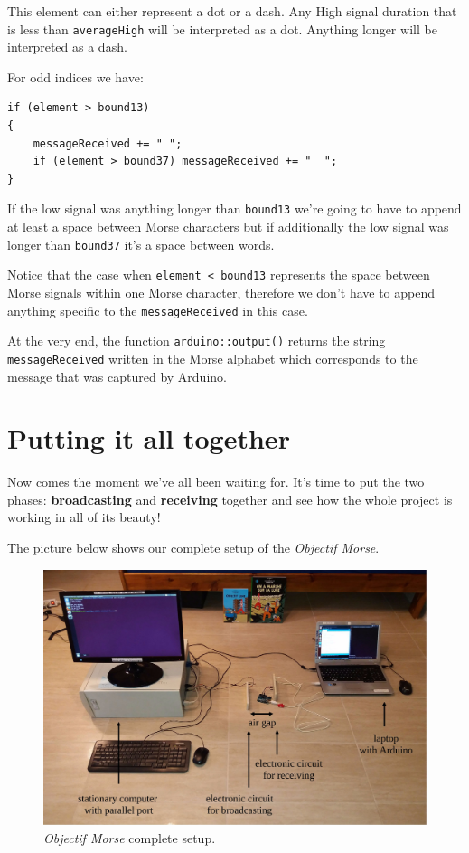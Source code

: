 \documentclass[12pt]{report}
\begin{document}
This element can either represent a dot or a dash. Any High signal duration that is less than \texttt{averageHigh} will be interpreted as a dot. Anything longer will be interpreted as a dash.

For odd indices we have:

\begin{lstlisting}
if (element > bound13)
{
	messageReceived += " ";
	if (element > bound37) messageReceived += "  ";
}
\end{lstlisting}

If the low signal was anything longer than \texttt{bound13} we're going to have to append at least a space between Morse characters but if additionally the low signal was longer than \texttt{bound37} it's a space between words.

Notice that the case when \texttt{element < bound13} represents the space between Morse signals within one Morse character, therefore we don't have to append anything specific to the \texttt{messageReceived} in this case.

At the very end, the function \texttt{arduino::output()} returns the string \texttt{messageReceived} written in the Morse alphabet which corresponds to the message that was captured by Arduino.

\chapter{Putting it all together}

Now comes the moment we've all been waiting for. It's time to put the two phases: \textbf{broadcasting} and \textbf{receiving} together and see how the whole project is working in all of its beauty!

The picture below shows our complete setup of the \textit{Objectif Morse}.

\begin{figure}[H]
\centering\includegraphics[width=14.5cm]{full_setup}
\caption{\textit{Objectif Morse} complete setup.}				
\label{fig:full_setup}
\end{figure}
\end{document}
